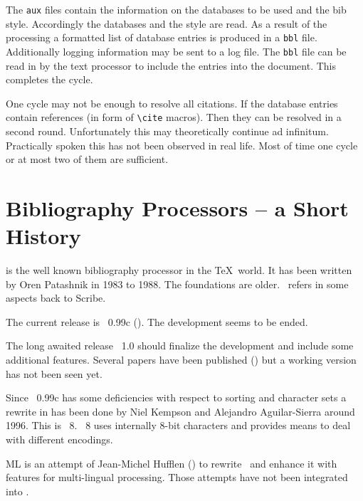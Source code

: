 The \texttt{aux} files contain the information on the databases to be
used and the bib style. Accordingly the databases and the style are
read. As a result of the processing a formatted list of database
entries is produced in a \texttt{bbl} file. Additionally logging
information may be sent to a log file. The \texttt{bbl} file can be
read in by the text processor to include the entries into the
document. This completes the cycle.

One cycle may not be enough to resolve all citations. If the database
entries contain references (in form of \verb|\cite|
macros). Then they can be resolved in a
second round. Unfortunately this may theoretically continue ad
infinitum. Practically spoken this has not been observed in real life.
Most of time one cycle or at most two of them are sufficient.


\section{Bibliography Processors -- a Short History}

\BibTeX{} is the well known bibliography processor
in the \TeX\ world. It has been written by Oren
Patashnik in 1983 to 1988. The foundations are
older. \BibTeX\ refers in some aspects back to Scribe.

The current release is \BibTeX~0.99c
(\cite{btxdoc,btxhak}). The development seems to be ended.

The long awaited release \BibTeX~1.0
should finalize the development and include some additional features.
Several papers have been published
(\cite{patashnik:bibtex1.0,patashnik:bibtex}) but a working version
has not been seen yet.

Since \BibTeX~0.99c has some
deficiencies with respect to sorting and character sets a rewrite in
has been done by Niel Kempson and Alejandro
Aguilar-Sierra around 1996. This is
\BibTeX~8. \BibTeX~8 uses internally 8-bit characters and provides
means to deal with different encodings.

ML\BibTeX{} is an attempt of Jean-Michel
Hufflen (\cite{hufflenO1b:oip}) to rewrite
\BibTeX\ and enhance it with features for multi-lingual processing.
Those attempts have not been integrated into \ExBib.

